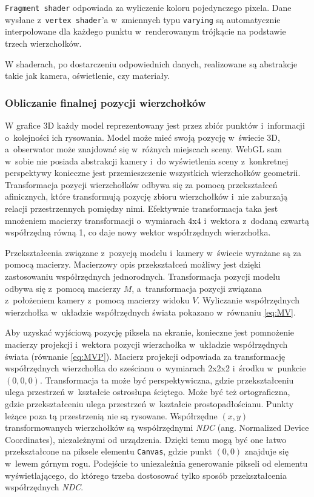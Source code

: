 \texttt{Fragment shader} odpowiada za wyliczenie koloru pojedynczego pixela. Dane wysłane z~\texttt{vertex shader}'a w~zmiennych typu \texttt{varying} są automatycznie interpolowane dla każdego punktu w~renderowanym trójkącie na podstawie trzech wierzchołków.

W shaderach, po dostarczeniu odpowiednich danych, realizowane są abstrakcje takie jak kamera, oświetlenie, czy materiały.

\subsubsection{Obliczanie finalnej pozycji wierzchołków}

W grafice 3D każdy model reprezentowany jest przez zbiór punktów i~informacji o~kolejności ich rysowania. Model może mieć swoją pozycję w~świecie 3D, a~obserwator może znajdować się w~różnych miejscach sceny. WebGL sam w~sobie nie posiada abstrakcji kamery i~do wyświetlenia sceny z~konkretnej perspektywy konieczne jest przemieszczenie wszystkich wierzchołków geometrii. Transformacja pozycji wierzchołków odbywa się za pomocą przekształceń afinicznych, które transformują pozycję zbioru wierzchołków i~nie zaburzają relacji przestrzennych pomiędzy nimi. Efektywnie transformacja taka jest mnożeniem macierzy transformacji o~wymiarach 4x4 i~wektora z~dodaną czwartą współrzędną równą 1, co daje nowy wektor współrzędnych wierzchołka.

Przekształcenia związane z~pozycją modelu i~kamery w~świecie wyrażane są za pomocą macierzy. Macierzowy opis przekształceń możliwy jest dzięki zastosowaniu współrzędnych jednorodnych\cite{Homogeneous}. Transformacja pozycji modelu odbywa się z~pomocą macierzy $M$, a~transformacja pozycji związana z~położeniem kamery z~pomocą macierzy widoku $V$. Wyliczanie współrzędnych wierzchołka w~układzie współrzędnych świata pokazano w~równaniu \ref{eq:MV}.

Aby uzyskać wyjściową pozycję piksela na ekranie, konieczne jest pomnożenie macierzy projekcji i~wektora pozycji wierzchołka w~układzie współrzędnych świata (równanie \ref{eq:MVP}). Macierz projekcji odpowiada za transformację współrzędnych wierzchołka do sześcianu o~wymiarach 2x2x2 i~środku w~punkcie $(0, 0, 0)$. Transformacja ta może być perspektywiczna, gdzie przekształceniu ulega przestrzeń w~kształcie ostrosłupa ściętego. Może być też ortograficzna, gdzie przekształceniu ulega przestrzeń w~kształcie prostopadłościanu. Punkty leżące poza tą przestrzenią nie są rysowane. Współrzędne $(x, y)$ transformowanych wierzchołków są współrzędnymi \textit{NDC} (ang. Normalized Device Coordinates), niezależnymi od urządzenia. Dzięki temu mogą być one łatwo przekształcone na piksele elementu \texttt{Canvas}, gdzie punkt $(0, 0)$ znajduje się w~lewem górnym rogu. Podejście to uniezależnia generowanie pikseli od elementu wyświetlającego, do którego trzeba dostosować tylko sposób przekształcenia współrzędnych \textit{NDC}.

